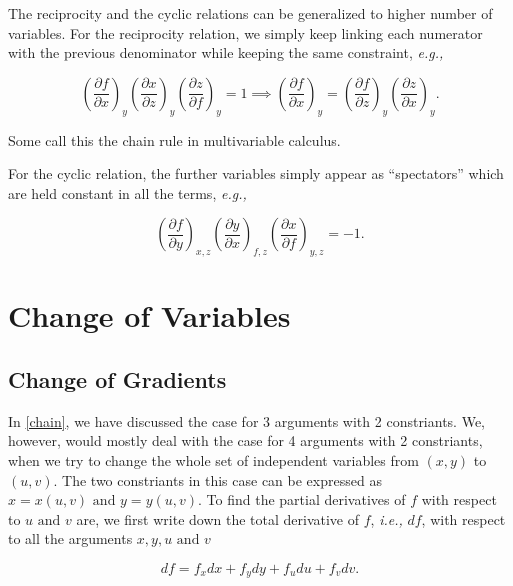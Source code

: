\documentclass[english,a4paper,12pt]{report}
\begin{document}
The reciprocity and the cyclic relations can be generalized to higher number of variables. For the reciprocity relation, we simply keep linking each numerator with the previous denominator while keeping the same constraint, \textit{e.g.,} 

\begin{equation}
	\left( \frac{\partial f}{\partial x}  \right)_{y} \left( \frac{\partial x}{\partial z}  \right)_{y} \left( \frac{\partial z}{\partial f}  \right)_{y} = 1 \implies \left( \frac{\partial f}{\partial x}  \right)_{y}  = \left( \frac{\partial f}{\partial z}  \right)_{y} \left( \frac{\partial z}{\partial x}  \right)_{y}.  
\end{equation}

Some call this the chain rule in multivariable calculus.

For the cyclic relation, the further variables simply appear as ``spectators'' which are held constant in all the terms, \textit{e.g.,} 

\begin{equation}
	\left( \frac{\partial f}{\partial y}  \right)_{x,z} \left( \frac{\partial y}{\partial x}  \right)_{f,z}\left( \frac{\partial x}{\partial f}  \right)_{y,z} = -1.  
\end{equation}



\section{Change of Variables}

\subsection{Change of Gradients}

In \cref{chain}, we have discussed the case for 3 arguments with 2 constriants. We, however, would mostly deal with the case for 4 arguments with 2 constriants, when we try to change the whole set of independent variables from \((x,y)\) to \((u,v)\). The two constriants in this case can be expressed as \(x=x(u,v) \text { and } y=y(u,v)\). To find the partial derivatives of \(f\) with respect to \(u \text { and } v\) are, we first write down the total derivative of \(f\), \textit{i.e.,} \(df\), with respect to all the arguments \(x,y,u\text { and } v\)

\begin{equation}
	df = f_{x}  dx + f_{y}  dy + f_{u} du + f_{v} dv.    
\end{equation}
\end{document}

